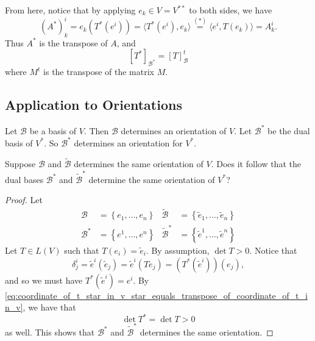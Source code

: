 \documentclass[notoc,notitlepage]{tufte-book}
\begin{document}
From here, notice that by applying $e_k \in V = V^{**}$ to both sides,
we have %
\begin{equation*}
  (A^*)_k^i = e_k ( T^*(e^i) ) = \langle T^* (e^i), e_k \rangle
  \overset{(*)}{=} \langle e^i, T(e_k) \rangle = A_k^i.
\end{equation*}
Thus $A^*$ is the transpose of $A$, and
\begin{equation}\label{eq:coordinate_of_t_star_in_v_star_equals_transpose_of_coordinate_of_t_in_v}
  [ T^* ]_{\mathcal{B}^*} = [ T ]_{\mathcal{B}}^t
\end{equation}
where $M^t$ is the transpose of the matrix $M$.

\subsection{Application to Orientations}%
\label{sub:application_to_orientations}

Let $\mathcal{B}$ be a basis of $V$. Then $\mathcal{B}$ determines an
orientation of $V$. Let $\mathcal{B}^*$ be the dual basis of $V^*$.
So $\mathcal{B}^*$ determines an orientation for $V^*$.

\begin{eg}
  Suppose $\mathcal{B}$ and $\tilde{\mathcal{B}}$ determines the same
  orientation of $V$. Does it follow that the dual bases $\mathcal{B}^*$
  and $\tilde{\mathcal{B}}^*$ determine the same orientation of $V^*$?
\end{eg}

\begin{proof}
  Let
  \begin{align*}
    \mathcal{B} &= \left\{ e_1, \ldots, e_n \right\} &
    \tilde{\mathcal{B}} &= \left\{ \tilde{e}_1, \ldots, \tilde{e}_n \right\} \\
    \mathcal{B}^* &= \left\{ e^1, \ldots, e^n \right\} &
    \tilde{\mathcal{B}}^* &= \left\{ \tilde{e}^1, \ldots, \tilde{e}^n \right\}
  \end{align*}
  Let $T \in L(V)$ such that $T(e_i) = \tilde{e}_i$. By assumption, $\det T > 0$.
  Notice that
  \begin{equation*}
    \delta_j^i = \tilde{e}^i (\tilde{e}_j) = \tilde{e}^i ( Te_j ) = (T^*(\tilde{e}^i))(e_j),
  \end{equation*}
  and so we must have $T^*(\tilde{e}^i) = e^i$. By
  \cref{eq:coordinate_of_t_star_in_v_star_equals_transpose_of_coordinate_of_t_in_v},
  we have that
  \begin{equation*}
    \det T^* = \det T > 0
  \end{equation*}
  as well. This shows that $\mathcal{B}^*$ and $\tilde{\mathcal{B}}^*$ determines
  the same orientation.
\end{proof}
\end{document}
